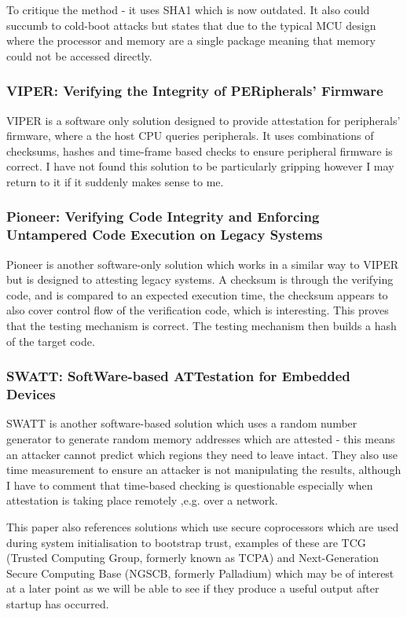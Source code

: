 To critique the method - it uses SHA1 which is now outdated. It also could succumb to cold-boot attacks but states that due to the typical MCU design where the processor and memory are a single package meaning that memory could not be accessed directly.

\subsubsection{VIPER: Verifying the Integrity of PERipherals’ Firmware}

VIPER \cite{Li2011} is a software only solution designed to provide attestation for peripherals’ firmware, where a the host CPU queries peripherals. It uses combinations of checksums, hashes and time-frame based checks to ensure peripheral firmware is correct. I have not found this solution to be particularly gripping however I may return to it if it suddenly makes sense to me.

\subsubsection{Pioneer: Verifying Code Integrity and Enforcing Untampered Code Execution on Legacy Systems}

Pioneer \cite{Seshadri2007} is another software-only solution which works in a similar way to VIPER but is designed to attesting legacy systems. A checksum is through the verifying code, and is compared to an expected execution time, the checksum appears to also cover control flow of the verification code, which is interesting. This proves that the testing mechanism is correct. The testing mechanism then builds a hash of the target code.

\subsubsection{SWATT: SoftWare-based ATTestation for Embedded Devices}

SWATT \cite{Seshadri2004} is another software-based solution which uses a random number generator to generate random memory addresses which are attested - this means an attacker cannot predict which regions they need to leave intact. They also use time measurement to ensure an attacker is not manipulating the results, although I have to comment that time-based checking is questionable especially when attestation is taking place remotely ,e.g. over a network.

This paper also references solutions which use secure coprocessors which are used during system initialisation to bootstrap trust, examples of these are TCG (Trusted Computing Group, formerly known as TCPA) and Next-Generation Secure Computing Base (NGSCB, formerly Palladium) which may be of interest at a later point as we will be able to see if they produce a useful output after startup has occurred.

